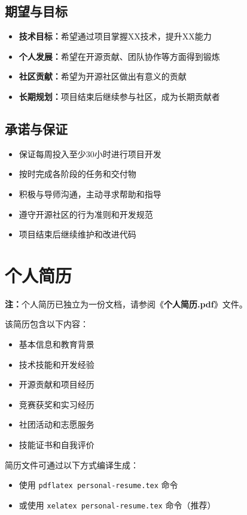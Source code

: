 \documentclass[a4paper,12pt]{article}
\begin{document}
\subsection{期望与目标}
\begin{itemize}
    \item \textbf{技术目标：}希望通过项目掌握XX技术，提升XX能力
    \item \textbf{个人发展：}希望在开源贡献、团队协作等方面得到锻炼
    \item \textbf{社区贡献：}希望为开源社区做出有意义的贡献
    \item \textbf{长期规划：}项目结束后继续参与社区，成为长期贡献者
\end{itemize}

\subsection{承诺与保证}
\begin{itemize}
    \item 保证每周投入至少30小时进行项目开发
    \item 按时完成各阶段的任务和交付物
    \item 积极与导师沟通，主动寻求帮助和指导
    \item 遵守开源社区的行为准则和开发规范
    \item 项目结束后继续维护和改进代码
\end{itemize}

\section{个人简历}

\textcolor{osppblue}{\textbf{注：}}个人简历已独立为一份文档，请参阅《\textcolor{osppblue}{\textbf{个人简历.pdf}}》文件。

该简历包含以下内容：
\begin{itemize}
    \item 基本信息和教育背景
    \item 技术技能和开发经验
    \item 开源贡献和项目经历
    \item 竞赛获奖和实习经历
    \item 社团活动和志愿服务
    \item 技能证书和自我评价
\end{itemize}

简历文件可通过以下方式编译生成：
\begin{itemize}
    \item 使用 \texttt{pdflatex personal-resume.tex} 命令
    \item 或使用 \texttt{xelatex personal-resume.tex} 命令（推荐）
\end{itemize}
\end{document}
